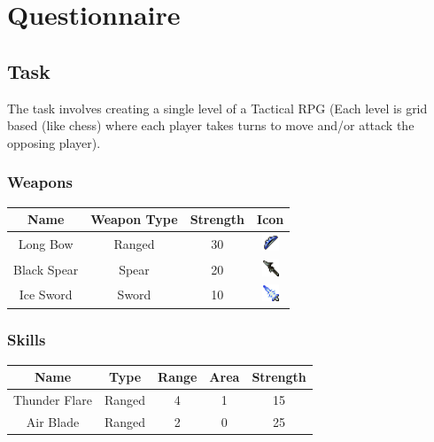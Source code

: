 \section{Questionnaire}
\subsection{Task}

The task involves creating a single level of a Tactical RPG (Each level is grid based (like chess) where each player takes turns to move and/or attack the opposing player).   

\subsubsection*{Weapons}
\begin{center}
\begin{tabular}{c|c|c|c|}
	Name        & Weapon Type & Strength & Icon \\\hline
	Long Bow    & Ranged      & 30       & \includegraphics[height=0.5cm]{figures/bow.png}   \\ 
	Black Spear & Spear       & 20       & \includegraphics[height=0.5cm]{figures/spear.png} \\ 
	Ice Sword   & Sword       & 10       & \includegraphics[height=0.5cm]{figures/sword.png} \\ 
\end{tabular}
\end{center}

\subsubsection*{Skills}
\begin{center}
	\begin{tabular}{c|c|c|c|c}
		
		Name          & Type   & Range & Area & Strength \\\hline
		Thunder Flare & Ranged & 4     & 1    & 15       \\ 
	 	Air Blade     & Ranged & 2     & 0    & 25       \\ 
	\end{tabular}
\end{center}


